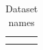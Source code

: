 \documentclass[conference]{IEEEtran}
\begin{document}
\begin{table}
\begin{tabular}{cc}
        
        \hline \\
        &
    \end{tabular}
    \caption{Dataset names}
    \label{tab:data_names}
\end{table}
\end{document}

